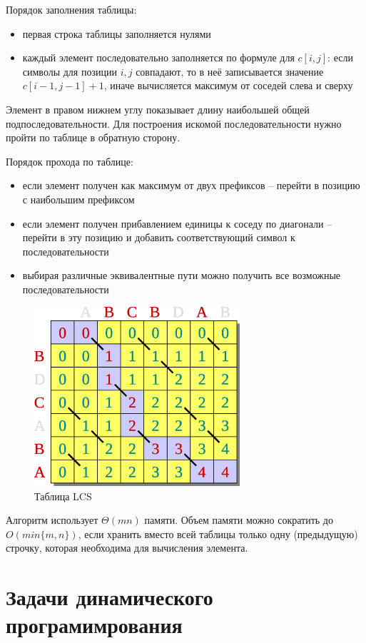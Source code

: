 \documentclass[11pt]{article}
\begin{document}
Порядок заполнения таблицы:
\begin{itemize}
\item первая строка таблицы заполняется нулями
\item каждый элемент последовательно заполняется по формуле для $c[i, j]$: если символы для позиции $i, j$ совпадают, то в неё записывается значение $c[i-1, j-1]+1$, иначе вычисляется максимум от соседей слева и сверху
\end{itemize}
Элемент в правом нижнем углу показывает длину наибольшей общей подпоследовательности. Для построения искомой последовательности нужно пройти по таблице в обратную сторону.

Порядок прохода по таблице:
\begin{itemize}
\item если элемент получен как максимум от двух префиксов -- перейти в позицию с наибольшим префиксом
\item если элемент получен прибавлением единицы к соседу по диагонали -- перейти в эту позицию и добавить соответствующий символ к последовательности
\item выбирая различные эквивалентные пути можно получить все возможные последовательности
\end{itemize}
\begin{figure}[h!]
  \centering
  \includegraphics[width=3in]{lecture15/table2.eps}
  \caption{Таблица LCS}
\end{figure}

Алгоритм использует $\Theta(mn)$ памяти. Объем памяти можно сократить до $O(min\{m, n\})$, если хранить вместо всей таблицы только одну (предыдущую) строчку, которая необходима для вычисления элемента.

\section{Задачи динамического програмимрования}
\end{document}
